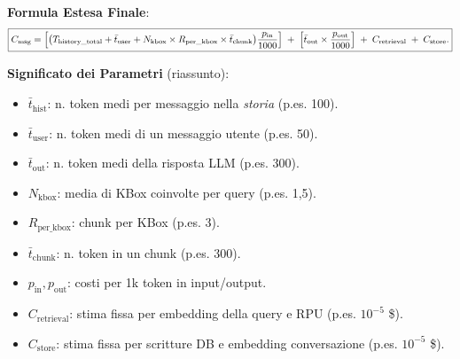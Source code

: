 \documentclass{article}
\begin{document}
\noindent
\textbf{Formula Estesa Finale}:
\[
\boxed{
C_{\text{msg}}
=
\Bigl[\bigl(T_{\text{history\_total}} + \bar{t}_{\text{user}} + N_{\text{kbox}} \times R_{\text{per\_kbox}} \times \bar{t}_{\text{chunk}}\bigr)\frac{p_{\text{in}}}{1000}
\Bigr]
\;+\;
\Bigl[\bar{t}_{\text{out}} \times \frac{p_{\text{out}}}{1000}\Bigr]
\;+\;
C_{\text{retrieval}}
\;+\;
C_{\text{store}}.
}
\]

\medskip

\textbf{Significato dei Parametri} (riassunto):
\begin{itemize}
    \item \(\bar{t}_{\text{hist}}\): n. token medi per messaggio nella \emph{storia} (p.es. 100).
    \item \(\bar{t}_{\text{user}}\): n. token medi di un messaggio utente (p.es. 50).
    \item \(\bar{t}_{\text{out}}\): n. token medi della risposta LLM (p.es. 300).
    \item \(N_{\text{kbox}}\): media di KBox coinvolte per query (p.es. 1,5).
    \item \(R_{\text{per\_kbox}}\): chunk per KBox (p.es. 3).
    \item \(\bar{t}_{\text{chunk}}\): n. token in un chunk (p.es. 300).
    \item \(p_{\text{in}}, p_{\text{out}}\): costi per 1k token in input/output.
    \item \(C_{\text{retrieval}}\): stima fissa per embedding della query e RPU (p.es. $10^{-5}$ \$).
    \item \(C_{\text{store}}\): stima fissa per scritture DB e embedding conversazione (p.es. $10^{-5}$ \$).
\end{itemize}

\bigskip

\noindent
\end{document}
